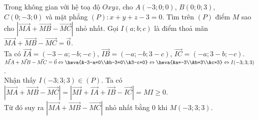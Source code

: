 \begin{vd}%
	Trong không gian với hệ toạ độ $Oxyz$, cho $A(-3;0;0)$, $B(0;0;3)$, $C(0;-3;0)$ và mặt phẳng $(P)\colon x+y+z-3=0$. Tìm trên $(P)$ điểm $M$ sao cho $\left|\vec{MA}+\vec{MB}-\vec{MC}\right|$ nhỏ nhất.	
	\loigiai
	{Gọi $I(a;b;c)$ là điểm thoả mãn $\vec{MA}+\vec{MB}-\vec{MC}=\vec{0}$.\\
		Ta có $\vec{IA}=(-3-a;-b;-c)$, $\vec{IB}=(-a;-b;3-c)$, $\vec{IC}=(-a; 3-b; -c)$.\\
		$\vec{MA}+\vec{MB}-\vec{MC}=\vec{0}\Leftrightarrow \heva{&-3-a=0\\&b-3=0\\&3-c=0}\Leftrightarrow \heva{&a=-3\\&b=3\\&c=3}\Leftrightarrow I(-3;3;3)$.\\
		Nhận thấy $I(-3;3;3)\in (P)$. Ta có $\left|\vec{MA}+\vec{MB}-\vec{MC}\right|=\left|\vec{MI}+\vec{IA}+\vec{IB}-\vec{IC}\right|=MI\geq 0$.\\
		Từ đó suy ra $\left|\vec{MA}+\vec{MB}-\vec{MC}\right|$ nhỏ nhất bằng $0$ khi $M(-3;3;3)$.}
\end{vd}
